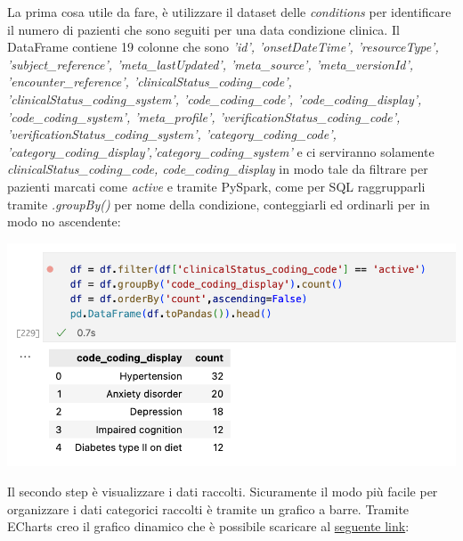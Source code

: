 \documentclass[11pt, oneside]{article}
\begin{document}
La prima cosa utile da fare, è utilizzare il dataset delle \emph{conditions} per identificare il numero di pazienti che sono seguiti per una data condizione clinica. Il DataFrame contiene 19 colonne che sono \emph{'id', 'onsetDateTime', 'resourceType', 'subject\_reference', 'meta\_lastUpdated', 'meta\_source', 'meta\_versionId', 'encounter\_reference', 'clinicalStatus\_coding\_code', 'clinicalStatus\_coding\_system', 'code\_coding\_code', 'code\_coding\_display', 'code\_coding\_system', 'meta\_profile', 'verificationStatus\_coding\_code', 'verificationStatus\_coding\_system', 'category\_coding\_code', 'category\_coding\_display','category\_coding\_system'} e ci serviranno solamente \emph{clinicalStatus\_coding\_code, code\_coding\_display} in modo tale da filtrare per pazienti marcati come \emph{active} e tramite PySpark, come per SQL raggrupparli tramite \emph{.groupBy()} per nome della condizione, conteggiarli ed ordinarli per in modo no ascendente:

\begin{center}
\includegraphics[scale=0.5]{1_conditions.png}
\end{center}

Il secondo step è visualizzare i dati raccolti. Sicuramente il modo più facile per organizzare i dati categorici raccolti è tramite un grafico a barre. Tramite ECharts creo il grafico dinamico che è possibile scaricare al \href{https://github.com/tommasoromano/scientific-vision/blob/main/renderers/bar_conditions.html}{seguente link}:
\end{document}
